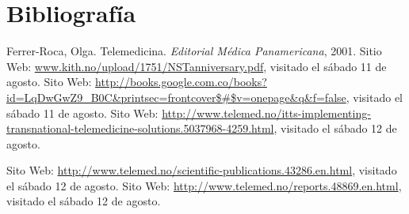 \documentclass[xcolor=svgnames]{beamer}
\begin{document}
\section{Bibliografía}
\begin{frame}[allowframebreacks]
\begin{thebibliography}{10}
  \beamertemplatebookbibitems
   Ferrer-Roca, Olga.
    \newblock Telemedicina.
    \newblock \emph{Editorial Médica Panamericana}, 2001.
  \beamertemplatebookbibitems
   Sitio Web: \url{www.kith.no/upload/1751/NSTanniversary.pdf}, visitado el sábado 11 de agosto.
  \beamertemplatearticlebibitems
   Sito Web: \url{http://books.google.com.co/books?id=LqDwGwZ9_B0C&printsec=frontcover$\#$v=onepage&q&f=false}, visitado el sábado 11 de agosto.
  \beamertemplatearticlebibitems
   Sito Web: \url{http://www.telemed.no/itts-implementing-transnational-telemedicine-solutions.5037968-4259.html}, visitado el sábado 12 de agosto.
\end{thebibliography}
\end{frame}
\begin{frame}
\begin{thebibliography}{10}
  \beamertemplatearticlebibitems
   Sito Web: \url{http://www.telemed.no/scientific-publications.43286.en.html}, visitado el sábado 12 de agosto.
   Sito Web: \url{http://www.telemed.no/reports.48869.en.html}, visitado el sábado 12 de agosto.
\end{thebibliography}
\end{frame}
\end{document}
